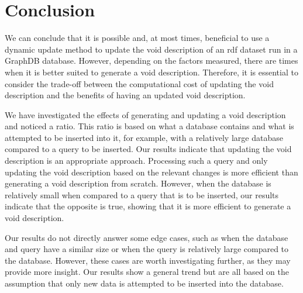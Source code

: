 \section{Conclusion}\label{sec:conclusion}
We can conclude that it is possible and, at most times, beneficial to use a dynamic update method to update the \gls{void} description of an \gls{rdf} dataset run in a GraphDB database. However, depending on the factors measured, there are times when it is better suited to generate a \gls{void} description. Therefore, it is essential to consider the trade-off between the computational cost of updating the \gls{void} description and the benefits of having an updated \gls{void} description.


We have investigated the effects of generating and updating a \gls{void} description and noticed a ratio. This ratio is based on what a database contains and what is attempted to be inserted into it, for example, with a relatively large database compared to a query to be inserted. Our results indicate that updating the \gls{void} description is an appropriate approach. Processing such a query and only updating the \gls{void} description based on the relevant changes is more efficient than generating a \gls{void} description from scratch. However, when the database is relatively small when compared to a query that is to be inserted, our results indicate that the opposite is true, showing that it is more efficient to generate a \gls{void} description.

Our results do not directly answer some edge cases, such as when the database and query have a similar size or when the query is relatively large compared to the database. However, these cases are worth investigating further, as they may provide more insight. Our results show a general trend but are all based on the assumption that only new data is attempted to be inserted into the database.


